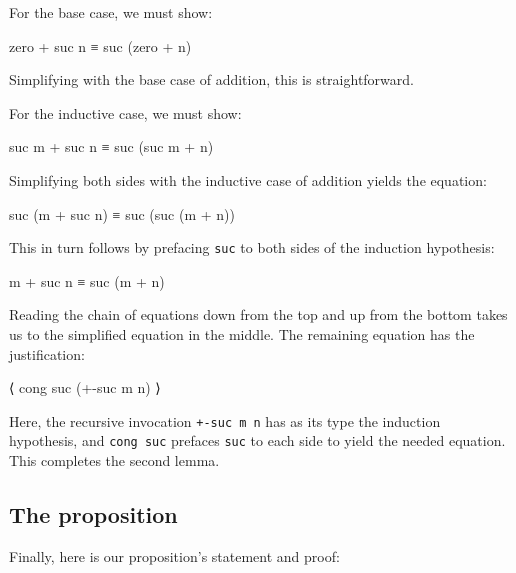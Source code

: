For the base case, we must show:

\begin{myDisplay}
zero + suc n ≡ suc (zero + n)
\end{myDisplay}

Simplifying with the base case of addition, this is straightforward.

For the inductive case, we must show:

\begin{myDisplay}
suc m + suc n ≡ suc (suc m + n)
\end{myDisplay}

Simplifying both sides with the inductive case of addition yields the
equation:

\begin{myDisplay}
suc (m + suc n) ≡ suc (suc (m + n))
\end{myDisplay}

This in turn follows by prefacing \texttt{suc} to both sides of the
induction hypothesis:

\begin{myDisplay}
m + suc n ≡ suc (m + n)
\end{myDisplay}

Reading the chain of equations down from the top and up from the bottom
takes us to the simplified equation in the middle. The remaining
equation has the justification:

\begin{myDisplay}
⟨ cong suc (+-suc m n) ⟩
\end{myDisplay}

Here, the recursive invocation \texttt{+-suc\ m\ n} has as its type the
induction hypothesis, and \texttt{cong\ suc} prefaces \texttt{suc} to
each side to yield the needed equation. This completes the second lemma.

\hypertarget{the-proposition}{%
\subsection{The proposition}\label{the-proposition}}

Finally, here is our proposition's statement and proof:

